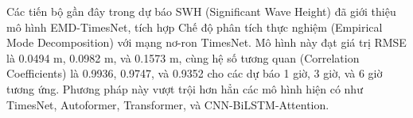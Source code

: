 Các tiến bộ gần đây trong dự báo SWH (Significant Wave Height)\cite{timesnet} đã giới thiệu mô hình EMD-TimesNet, tích hợp Chế độ phân tích thực nghiệm (Empirical Mode Decomposition) với mạng nơ-ron TimesNet. Mô hình này đạt giá trị RMSE là 0.0494 m, 0.0982 m, và 0.1573 m, cùng hệ số tương quan (Correlation Coefficients) là 0.9936, 0.9747, và 0.9352 cho các dự báo 1 giờ, 3 giờ, và 6 giờ tương ứng. Phương pháp này vượt trội hơn hẳn các mô hình hiện có như TimesNet, Autoformer, Transformer, và CNN-BiLSTM-Attention.